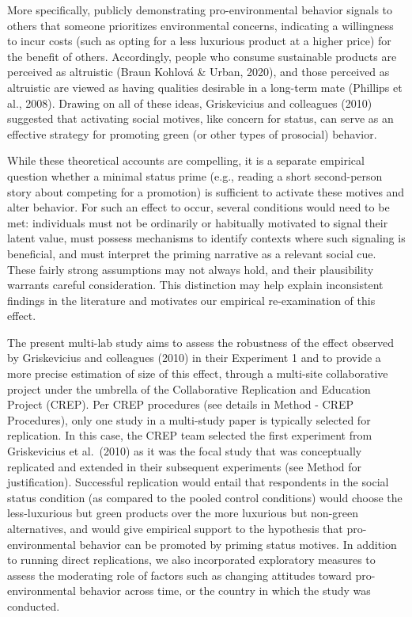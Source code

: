 \documentclass[
]{article}
\begin{document}
More specifically, publicly demonstrating pro-environmental behavior
signals to others that someone prioritizes environmental concerns,
indicating a willingness to incur costs (such as opting for a less
luxurious product at a higher price) for the benefit of others.
Accordingly, people who consume sustainable products are perceived as
altruistic (Braun Kohlová \& Urban, 2020), and those perceived as
altruistic are viewed as having qualities desirable in a long-term mate
(Phillips et al., 2008). Drawing on all of these ideas, Griskevicius and
colleagues (2010) suggested that activating social motives, like concern
for status, can serve as an effective strategy for promoting green (or
other types of prosocial) behavior.

While these theoretical accounts are compelling, it is a separate
empirical question whether a minimal status prime (e.g., reading a short
second-person story about competing for a promotion) is sufficient to
activate these motives and alter behavior. For such an effect to occur,
several conditions would need to be met: individuals must not be
ordinarily or habitually motivated to signal their latent value, must
possess mechanisms to identify contexts where such signaling is
beneficial, and must interpret the priming narrative as a relevant
social cue. These fairly strong assumptions may not always hold, and
their plausibility warrants careful consideration. This distinction may
help explain inconsistent findings in the literature and motivates our
empirical re-examination of this effect.

The present multi-lab study aims to assess the robustness of the effect
observed by Griskevicius and colleagues (2010) in their Experiment 1 and
to provide a more precise estimation of size of this effect, through a
multi-site collaborative project under the umbrella of the Collaborative
Replication and Education Project (CREP). Per CREP procedures (see
details in Method - CREP Procedures), only one study in a multi-study
paper is typically selected for replication. In this case, the CREP team
selected the first experiment from Griskevicius et al.~(2010) as it was
the focal study that was conceptually replicated and extended in their
subsequent experiments (see Method for justification). Successful
replication would entail that respondents in the social status condition
(as compared to the pooled control conditions) would choose the
less-luxurious but green products over the more luxurious but non-green
alternatives, and would give empirical support to the hypothesis that
pro-environmental behavior can be promoted by priming status motives. In
addition to running direct replications, we also incorporated
exploratory measures to assess the moderating role of factors such as
changing attitudes toward pro-environmental behavior across time, or the
country in which the study was conducted.
\end{document}
